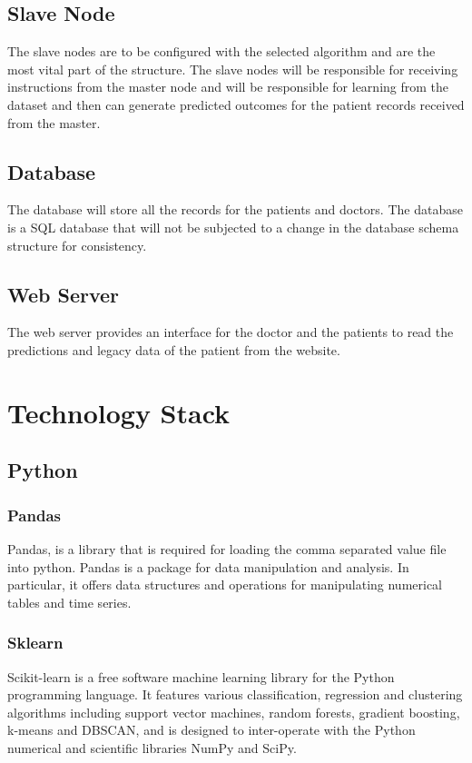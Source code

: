 \documentclass[12pt]{article}
\begin{document}
\subsection{Slave Node}
The slave nodes are to be configured with the selected algorithm and are the most vital part of the structure. The slave nodes will be responsible for receiving instructions from the master node and will be responsible for learning from the dataset and then can generate predicted outcomes for the patient records received from the master. 

\subsection{Database}
The database will store all the records for the patients and doctors. The database is a SQL database that will not be subjected to a change in the database schema structure for consistency.

\subsection{Web Server}
The web server provides an interface for the doctor and the patients to read the predictions and legacy data of the patient from the website.

\newpage
\section{Technology Stack}
\subsection{Python}
\subsubsection{Pandas}
Pandas, is a library that is required for loading the comma separated value file into python. Pandas is a package for data manipulation and analysis. In particular, it offers data structures and operations for manipulating numerical tables and time series.

\subsubsection{Sklearn}
Scikit-learn is a free software machine learning library for the Python programming language. It features various classification, regression and clustering algorithms including support vector machines, random forests, gradient boosting, k-means and DBSCAN, and is designed to inter-operate with the Python numerical and scientific libraries NumPy and SciPy.
\end{document}
